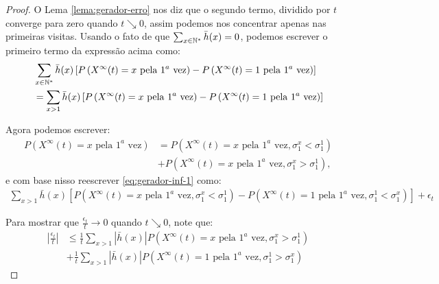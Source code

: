 \begin{proof}
  O Lema \ref{lema:gerador-erro} nos diz que o segundo termo, dividido
  por $t$ converge para zero quando $t \searrow 0$, assim podemos nos
  concentrar apenas nas primeiras visitas. Usando o fato de que
  $\sum_{x\in{\mathbb{N^*}}}\bar{h}(x) = 0$, podemos escrever o primeiro termo da
  expressão acima como:
  \begin{align}
    \notag
    & \sum_{x \in {\mathbb{N^*}}} \bar{h}(x) \left[
      P\left( X^\infty(t) = x \text{ pela } 1^a \text{ vez} \right) - 
      P\left( X^\infty(t) = 1 \text{ pela } 1^a \text{ vez} \right)
    \right] \\
    \label{eq:gerador-inf-1}
    &= \sum_{x > 1} \bar{h}(x) \left[
      P\left( X^\infty(t) = x \text{ pela } 1^a \text{ vez} \right) - 
      P\left( X^\infty(t) = 1 \text{ pela } 1^a \text{ vez} \right)
    \right]
  \end{align}
  

  Agora podemos escrever:
  \begin{align*}
    P\left( X^\infty(t) = x \text{ pela } 1^a \text{ vez} \right) &=
    P\left(
      X^\infty(t) = x \text{ pela } 1^a \text{ vez},
      \sigma^x_1 < \sigma^1_1
    \right) \\ &+
    P\left(
      X^\infty(t) = x \text{ pela } 1^a \text{ vez},
      \sigma^x_1 > \sigma^1_1
    \right),
  \end{align*}
  e com base nisso reescrever \eqref{eq:gerador-inf-1} como:
  \begin{gather}
    \label{eq:gerador-inf-2}
    \sum_{x > 1} \bar{h}(x) \left[
      P\left(
        X^\infty(t) = x \text{ pela } 1^a \text{ vez},
        \sigma^x_1 < \sigma^1_1
      \right) - 
      P\left(
        X^\infty(t) = 1 \text{ pela } 1^a \text{ vez},
        \sigma^1_1 < \sigma^x_1
      \right)
    \right]
    + \epsilon_t
  \end{gather}

  Para mostrar que $\frac{\epsilon_t}{t} \to 0$ quando $t
  \searrow 0$, note que:
  \begin{align}
    \left| \frac{\epsilon_t}{t} \right|
    \label{eq:gerador-inf-visita-1-antes}
    & \leq  \frac{1}{t} \sum_{x > 1}|\bar{h}(x)|
    P\left(
      X^\infty(t) = x \text{ pela } 1^a \text{ vez},
      \sigma^x_1 > \sigma^1_1
    \right)\\
    \label{eq:gerador-inf-visita-x-antes}    
    &+ \frac{1}{t} \sum_{x > 1}|\bar{h}(x)|
    P\left(
      X^\infty(t) = 1 \text{ pela } 1^a \text{ vez},
      \sigma^1_1 > \sigma^x_1
    \right)
  \end{align}


\end{proof}
